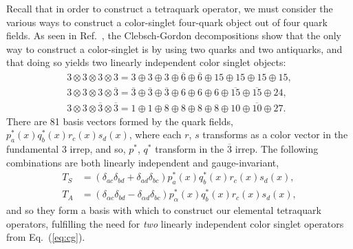 Recall that in order to construct a tetraquark operator, we must consider the various ways to construct a color-singlet four-quark object out of four quark fields. As seen in Ref.~\cite{pittir33243}, the Clebsch-Gordon decompositions show that the only way to construct a color-singlet is by using two quarks and two antiquarks, and that doing so yields two linearly independent color singlet objects:
\begin{equation}\label{eq:cg}
\begin{array}{l}
    {3 \otimes 3 \otimes 3 \otimes 3=3\oplus3\oplus3\oplus\overline{6}\oplus\overline{6}\oplus15\oplus15\oplus15\oplus15},\\
    {3 \otimes 3 \otimes 3 \otimes \overline{3}=\overline{3}\oplus\overline{3}\oplus\overline{3}\oplus6\oplus6\oplus6\oplus\overline{15}\oplus\overline{15}\oplus24},\\
    {3 \otimes 3 \otimes \overline{3} \otimes \overline{3}=1\oplus1\oplus8\oplus8\oplus8\oplus8\oplus10\oplus\overline{10}\oplus27}.
\end{array}
\end{equation}
There are 81 basis vectors formed by the quark fields, $p_{a}^{*}(x) q_{b}^{*}(x) r_{c}(x) s_{d}(x)$, where each $r$, $s$ transforms as a color vector in the fundamental $3$ irrep, and so, $p^{*}$, $q^{*}$ transform in the $\overline 3$ irrep. The following combinations are both linearly independent and gauge-invariant,
\begin{equation}\label{eq:tsta}
\begin{aligned} T_{S} &=\left(\delta_{a c} \delta_{b d}+\delta_{a d} \delta_{b c}\right) p_{a}^{*}(x) q_{b}^{*}(x) r_{c}(x) s_{d}(x), \\ T_{A} &=\left(\delta_{\alpha c} \delta_{b d}-\delta_{\alpha d} \delta_{b c}\right) p_{\alpha}^{*}(x) q_{b}^{*}(x) r_{c}(x) s_{d}(x),\end{aligned}
\end{equation}
and so they form a basis with which to construct our elemental tetraquark operators, fulfilling the need for \emph{two} linearly independent color singlet operators from Eq.~(\ref{eq:cg}).

